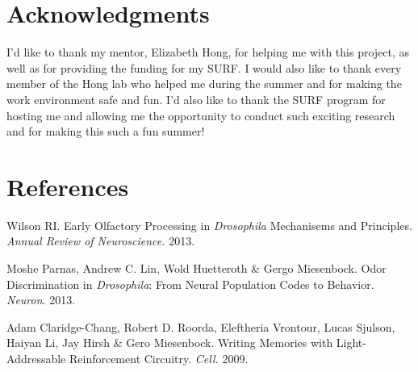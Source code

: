 \documentclass{article}
\begin{document}

\section{Acknowledgments}

I'd like to thank my mentor, Elizabeth Hong, for helping me with this project, as well as for providing the funding for my SURF. I would also like to thank every member of the Hong lab who helped me during the summer and for making the work environment safe and fun. I'd also like to thank the SURF program for hosting me and allowing me the opportunity to conduct such exciting research and for making this such a fun summer!


\section{References}

\begin{enumerate}

\begin{item}
Wilson RI. Early Olfactory Processing in \textit{Drosophila} Mechanisems and Principles. \textit{Annual Review of Neuroscience.} 2013.
\end{item}
\begin{item}
Moshe Parnas, Andrew C. Lin, Wold Huetteroth \& Gergo Miesenbock. Odor Discrimination in \textit{Drosophila}: From Neural Population Codes to Behavior. \textit{Neuron}. 2013.
\end{item}
\begin{item}
Adam Claridge-Chang, Robert D. Roorda, Eleftheria Vrontour, Lucas Sjulson, Haiyan Li, Jay Hirsh \& Gero Miesenbock. Writing Memories with Light-Addressable Reinforcement Circuitry. \textit{Cell.} 2009.
\end{item}

\end{enumerate}






\end{document}
